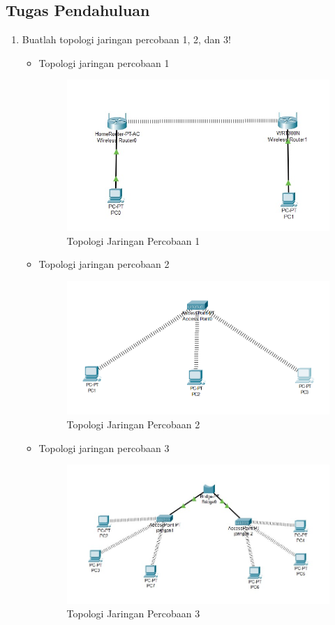 \subsection{Tugas Pendahuluan}
\begin{enumerate}
	\item Buatlah topologi jaringan percobaan 1, 2, dan 3!
	\begin{itemize}
		\item Topologi jaringan percobaan 1
		\begin{figure}[H]
		\centering
		\includegraphics[width=0.7\linewidth]{P1/img/topologi1.jpg}
		\caption{Topologi Jaringan Percobaan 1}
		\label{fig:gambar31}
	\end{figure}


	\end{itemize}
	\begin{itemize}
		\item Topologi jaringan percobaan 2
		\begin{figure}[H]
			\centering
			\includegraphics[width=0.7\linewidth]{P1/img/topologi2.png}
			\caption{Topologi Jaringan Percobaan 2}
			\label{fig:gambar32}
		\end{figure}
	\end{itemize}
	\begin{itemize}
		\item Topologi jaringan percobaan 3
		\begin{figure}[H]
			\centering
			\includegraphics[width=0.7\linewidth]{P1/img/topologi3.jpg}
			\caption{Topologi Jaringan Percobaan 3}
			\label{fig:gambar33}
		\end{figure}
	\end{itemize}


\end{enumerate}
